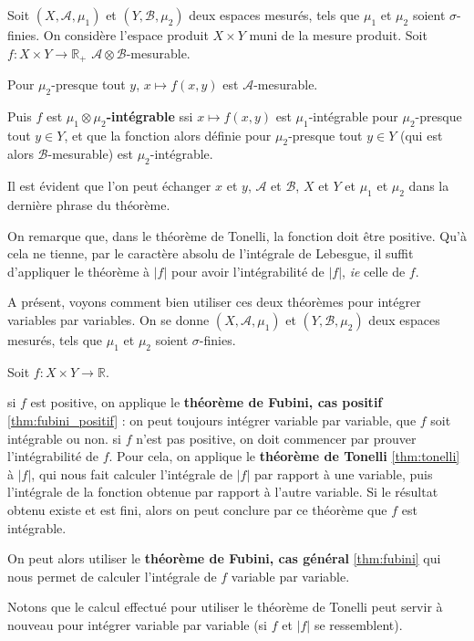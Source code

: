 \documentclass[../integ-proba.tex]{subfiles}
\begin{document}
\begin{thm}
  \label{thm:tonelli}
  Soit $\left(X, \mathcal{A}, \mu_1\right)$ et $\left(Y, \mathcal{B}, \mu_2\right)$ deux espaces mesurés, tels que $\mu_1$ et $\mu_2$ soient $\sigma$-finies.
  On considère l'espace produit $X \times Y$ muni de la mesure produit.
  Soit $f:X \times Y \rightarrow \mathbb{R}_+$ $\mathcal{A} \otimes \mathcal{B}$-mesurable.

  Pour $\mu_2$-presque tout $y$, $x \mapsto f(x,y)$ est $\mathcal{A}$-mesurable.

  Puis $f$ est $\mu_1 \otimes \mu_2$\textbf{-intégrable} ssi $x \mapsto f(x,y)$ est $\mu_1$-intégrable pour $\mu_2$-presque tout $y \in Y$,
  et que la fonction alors définie pour $\mu_2$-presque tout $y \in Y$ (qui est alors $\mathcal{B}$-mesurable) est $\mu_2$-intégrable.
\end{thm}

\begin{rem}
  Il est évident que l'on peut échanger $x$ et $y$, $\mathcal{A}$ et $\mathcal{B}$, $X$ et $Y$ et $\mu_1$ et $\mu_2$ dans la dernière phrase du théorème.
\end{rem}

\begin{rem}
  On remarque que, dans le théorème de Tonelli, la fonction doit être positive.
  Qu'à cela ne tienne, par le caractère absolu de l'intégrale de Lebesgue, il suffit d'appliquer le théorème à $\left|f\right|$ pour avoir l'intégrabilité de $\left|f\right|$, \textit{ie} celle de $f$.
\end{rem}

\begin{rem}
  A présent, voyons comment bien utiliser ces deux théorèmes pour intégrer variables par variables.
  On se donne $\left(X, \mathcal{A}, \mu_1\right)$ et $\left(Y, \mathcal{B}, \mu_2\right)$ deux espaces mesurés, tels que $\mu_1$ et $\mu_2$ soient $\sigma$-finies.

  Soit $f:X \times Y \rightarrow \mathbb{R}$.
  \begin{itemize}
    \itemb si $f$ est positive, on applique le \textbf{théorème de Fubini, cas positif} \ref{thm:fubini_positif} : on peut toujours intégrer variable par variable, que $f$ soit intégrable ou non.
    \itemb si $f$ n'est pas positive, on doit commencer par prouver l'intégrabilité de $f$.
    Pour cela, on applique le \textbf{théorème de Tonelli} \ref{thm:tonelli} à $\left|f\right|$, qui nous fait calculer l'intégrale de $\left|f\right|$ par rapport à une variable, puis l'intégrale de la fonction obtenue par rapport à l'autre variable.
    Si le résultat obtenu existe et est fini, alors on peut conclure par ce théorème que $f$ est intégrable.
    
    On peut alors utiliser le \textbf{théorème de Fubini, cas général} \ref{thm:fubini} qui nous permet de calculer l'intégrale de $f$ variable par variable.
    
    Notons que le calcul effectué pour utiliser le théorème de Tonelli peut servir à nouveau pour intégrer variable par variable (si $f$ et $\left|f\right|$ se ressemblent).
  \end{itemize}
\end{rem}
\end{document}
